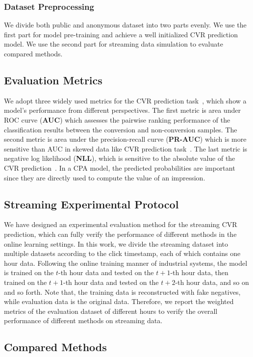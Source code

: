 \documentclass[letterpaper]{article} %
\begin{document}
\subsubsection{Dataset Preprocessing}
We divide both public and anonymous dataset into two parts evenly. We use the first part for model pre-training and achieve a well initialized CVR prediction model. We use the second part for streaming data simulation to evaluate compared methods.

\subsection{Evaluation Metrics}
We adopt three widely used metrics for the CVR prediction task~\cite{ni2018perceive,zhou2019deep,FNW,FSIW}, which show a model's performance from different perspectives. The first metric is area under ROC curve (\textbf{AUC}) which assesses the pairwise ranking performance of the classification results between the conversion and non-conversion samples. The second metric is area under the precision-recall curve (\textbf{PR-AUC}) which is more sensitive than AUC in skewed data like CVR prediction task~\cite{FSIW}. The last metric is negative log likelihood (\textbf{NLL}), which is sensitive to the absolute value of the CVR prediction~\cite{DFM}. In a CPA model, the predicted probabilities are important since they are directly used to compute the value of an impression.

\subsection{Streaming Experimental Protocol}
We have designed an experimental evaluation method for the streaming CVR prediction, which can fully verify the performance of different methods in the online learning settings. In this work, we divide the streaming dataset into multiple datasets according to the click timestamp, each of which contains one hour data. Following the online training manner of industrial systems, the model is trained on the $t$-th hour data and tested on the $t+1$-th hour data, then trained on the $t+1$-th hour data and tested on the $t+2$-th hour data, and so on and so forth. Note that, the training data is reconstructed with fake negatives, while evaluation data is the original data. Therefore, we report the weighted metrics of the evaluation dataset of different hours to verify the overall performance of different methods on streaming data.

\subsection{Compared Methods}
\end{document}
